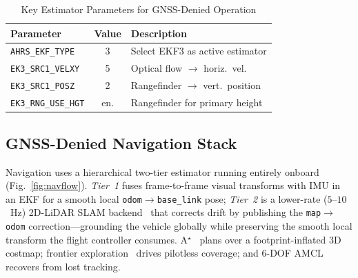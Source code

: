 \documentclass[journal]{IEEEtran}
\begin{document}
\begin{table}[!t]
\centering
\caption{Key Estimator Parameters for GNSS-Denied Operation}
\label{tab:ekf}
\begin{tabular}{lcl}
\toprule
Parameter & Value & Description\\
\midrule
\texttt{AHRS\_EKF\_TYPE} & 3 & Select EKF3 as active estimator\\
\texttt{EK3\_SRC1\_VELXY} & 5 & Optical flow $\rightarrow$ horiz.\ vel.\\
\texttt{EK3\_SRC1\_POSZ} & 2 & Rangefinder $\rightarrow$ vert.\ position\\
\texttt{EK3\_RNG\_USE\_HGT} & en. & Rangefinder for primary height\\
\bottomrule
\end{tabular}
\end{table}

\subsection{GNSS-Denied Navigation Stack}
Navigation uses a hierarchical two-tier estimator running entirely onboard
(Fig.~\ref{fig:navflow}). \emph{Tier~1} fuses frame-to-frame visual transforms with
IMU in an EKF for a smooth local \texttt{odom}$\rightarrow$\texttt{base\_link} pose;
\emph{Tier~2} is a lower-rate ($5$--$10$~Hz) 2D-LiDAR SLAM
backend~\cite{macenski2021slamtoolbox} that corrects drift by publishing the
\texttt{map}$\rightarrow$\texttt{odom} correction---grounding the vehicle globally
while preserving the smooth local transform the flight controller consumes.
A$^\star$~\cite{hart1968astar} plans over a footprint-inflated 3D costmap;
frontier exploration~\cite{yamauchi1997frontier} drives pilotless coverage; and
6-DOF AMCL~\cite{fox2001amcl} recovers from lost tracking.
\end{document}
